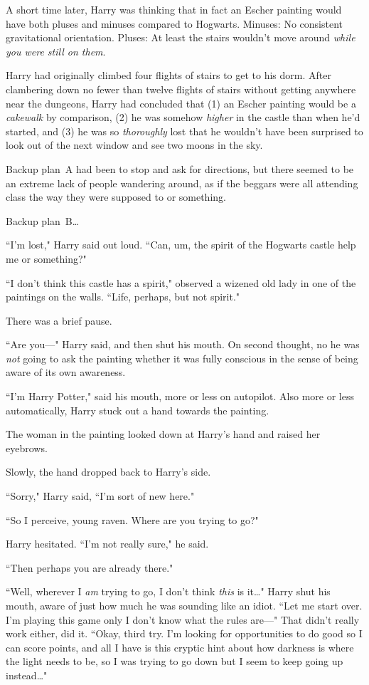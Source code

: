 A short time later, Harry was thinking that in fact an Escher painting would have both pluses and minuses compared to Hogwarts. Minuses: No consistent gravitational orientation. Pluses: At least the stairs wouldn't move around \emph{while you were still on them}.

Harry had originally climbed four flights of stairs to get to his dorm. After clambering down no fewer than twelve flights of stairs without getting anywhere near the dungeons, Harry had concluded that (1) an Escher painting would be a \emph{cakewalk} by comparison, (2) he was somehow \emph{higher} in the castle than when he'd started, and (3) he was so \emph{thoroughly} lost that he wouldn't have been surprised to look out of the next window and see two moons in the sky.

Backup plan~A had been to stop and ask for directions, but there seemed to be an extreme lack of people wandering around, as if the beggars were all attending class the way they were supposed to or something.

Backup plan~B{\ldots}

``I'm lost," Harry said out loud. ``Can, um, the spirit of the Hogwarts castle help me or something?"

``I don't think this castle has a spirit," observed a wizened old lady in one of the paintings on the walls. ``Life, perhaps, but not spirit."

There was a brief pause.

``Are you—" Harry said, and then shut his mouth. On second thought, no he was \emph{not} going to ask the painting whether it was fully conscious in the sense of being aware of its own awareness.

``I'm Harry Potter," said his mouth, more or less on autopilot. Also more or less automatically, Harry stuck out a hand towards the painting.

The woman in the painting looked down at Harry's hand and raised her eyebrows.

Slowly, the hand dropped back to Harry's side.

``Sorry," Harry said, ``I'm sort of new here."

``So I perceive, young raven. Where are you trying to go?"

Harry hesitated. ``I'm not really sure," he said.

``Then perhaps you are already there."

``Well, wherever I \emph{am} trying to go, I don't think \emph{this} is it{\ldots}" Harry shut his mouth, aware of just how much he was sounding like an idiot. ``Let me start over. I'm playing this game only I don't know what the rules are—" That didn't really work either, did it. ``Okay, third try. I'm looking for opportunities to do good so I can score points, and all I have is this cryptic hint about how darkness is where the light needs to be, so I was trying to go down but I seem to keep going up instead{\ldots}"

